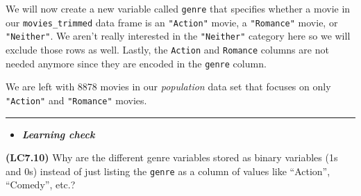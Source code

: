 \documentclass[]{tufte-book}
\newenvironment{Shaded}{\begin{snugshade}}{\end{snugshade}}
\newcommand{\KeywordTok}[1]{\textcolor[rgb]{0.13,0.29,0.53}{\textbf{{#1}}}}
\newcommand{\DataTypeTok}[1]{\textcolor[rgb]{0.13,0.29,0.53}{{#1}}}
\newcommand{\DecValTok}[1]{\textcolor[rgb]{0.00,0.00,0.81}{{#1}}}
\newcommand{\StringTok}[1]{\textcolor[rgb]{0.31,0.60,0.02}{{#1}}}
\newcommand{\NormalTok}[1]{{#1}}
\let\oldrule=\rule
\renewcommand{\rule}[1]{\oldrule{\linewidth}}
\newenvironment{rmdblock}[1]
  {\begin{shaded*}
  \begin{itemize}
  \renewcommand{\labelitemi}{
    \raisebox{-.7\height}[0pt][0pt]{
    }
  }
  \item
  }
  {
  \end{itemize}
  \end{shaded*}
  }
\newenvironment{learncheck}
  {\begin{rmdblock}{warning}}
  {\end{rmdblock}}
\begin{document}
\begin{Shaded}
\end{Shaded}

We will now create a new variable called \texttt{genre} that specifies
whether a movie in our \texttt{movies\_trimmed} data frame is an
\texttt{"Action"} movie, a \texttt{"Romance"} movie, or
\texttt{"Neither"}. We aren't really interested in the
\texttt{"Neither"} category here so we will exclude those rows as well.
Lastly, the \texttt{Action} and \texttt{Romance} columns are not needed
anymore since they are encoded in the \texttt{genre} column.

\begin{Shaded}
\end{Shaded}

We are left with 8878 movies in our \emph{population} data set that
focuses on only \texttt{"Action"} and \texttt{"Romance"} movies.

\begin{center}\rule{0.5\linewidth}{\linethickness}\end{center}

\begin{learncheck}
\textbf{\emph{Learning check}}
\end{learncheck}

\textbf{(LC7.10)} Why are the different genre variables stored as binary
variables (1s and 0s) instead of just listing the \texttt{genre} as a
column of values like ``Action'', ``Comedy'', etc.?
\end{document}
